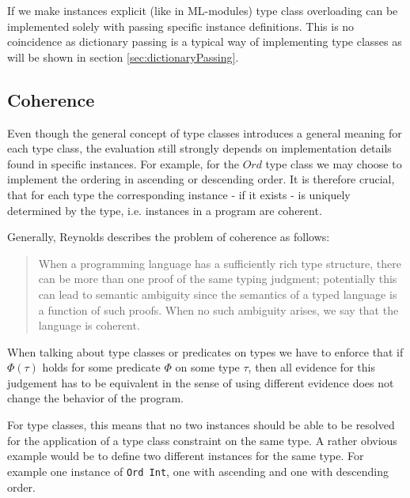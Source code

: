 If we make instances explicit (like in ML-modules) type class overloading can be implemented solely with passing specific instance definitions.
This is no coincidence as dictionary passing is a typical way of implementing type classes as will be shown in section \ref{sec:dictionaryPassing}.

\subsection{Coherence}\label{sec:coherence}

Even though the general concept of type classes introduces a general meaning for each type class, the evaluation still strongly depends on implementation details found in specific instances.
For example, for the $\mathit{Ord}$ type class we may choose to implement the ordering in ascending or descending order.
It is therefore crucial, that for each type the corresponding instance - if it exists - is uniquely determined by the type, i.e. instances in a program are coherent.

Generally, Reynolds \cite{reynolds_coherence} describes the problem of coherence as follows:

\begin{quote}
  When a programming language has a sufficiently rich type structure, there can be more than one proof of the same
  typing judgment; potentially this can lead to semantic ambiguity since the semantics of a typed language is a function
  of such proofs. When no such ambiguity arises, we say that the language is coherent.
\end{quote}

When talking about type classes or predicates on types we have to enforce that if $\Phi(\tau)$ holds for some predicate $\Phi$ on some type $\tau$,
then all evidence for this judgement has to be equivalent in the sense of using different evidence does not change the behavior of the program.

For type classes, this means that no two instances should be able to be resolved for the application of a type class constraint on the same type.
A rather obvious example would be to define two different instances for the same type.
For example one instance of \texttt{Ord Int}, one with ascending and one with descending order.

